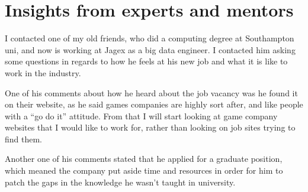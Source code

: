 \documentclass{scrartcl}
\begin{document}
\section{Insights from experts and mentors}

I contacted one of my old friends, who did a computing degree at Southampton uni, and now is working at Jagex as a big data engineer. 
I contacted him asking some questions in regards to how he feels at his new job and what it is like to work in the industry.

One of his comments about how he heard about the job vacancy was he found it on their website, as he said games companies are highly sort after, and like people with a ``go do it'' attitude.
From that I will start looking at game company websites that I would like to work for, rather than looking on job sites trying to find them.

Another one of his comments stated that he applied for a graduate position, which meaned the company put aside time and resources in order for him to patch the gaps in the knowledge he wasn't taught in university.





\end{document}
